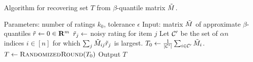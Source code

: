 \begin{algorithm}[t!]
\caption{Algorithm for recovering set $T$ from $\beta$-quantile matrix $\tilde{M}$.}
\label{alg:recover-T}
\begin{algorithmic}[1]
\State Parameters: number of ratings $k_0$, tolerance $\epsilon$
\State Input: matrix $\tilde{M}$ of approximate $\beta$-quantiles
\State $\tilde{r} \gets 0 \in \mathbf{R}^m$
\State $\tilde{r}_j \gets $ noisy rating for item $j$
\EndFor
\State Let $\mathcal{C}'$ be the set of $\alpha n$ indices $i \in [n]$ for which 
       $\sum_j \tilde{M}_{ij}\tilde{r}_j$ is largest.
\State $T_0 \gets \frac{1}{|\mathcal{C}'|} \sum_{i \in \mathcal{C}'} \tilde{M}_i$. 
\State $T \gets \textsc{RandomizedRound}(T_0)$ 
\State Output $T$
\EndIf
\EndWhile
\end{algorithmic}
\end{algorithm}
